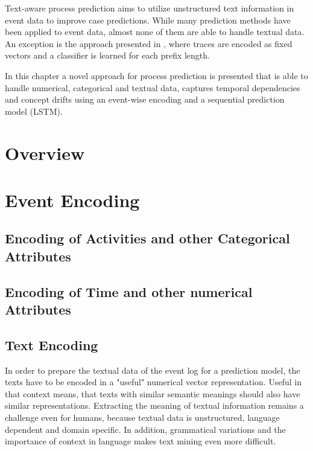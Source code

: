 Text-aware process prediction aims to utilize unstructured text information in event data to improve case predictions.
While many prediction methods have been applied to event data, almost none of them are able to handle textual data.
An exception is the approach presented in \cite{DBLP:conf/bpm/TeinemaaDMF16}, where traces are encoded as fixed vectors and a classifier is learned for each prefix length.

In this chapter a novel approach for process prediction is presented that is able to handle numerical, categorical and textual data, captures temporal dependencies and concept drifts using an event-wise encoding and a sequential prediction model (LSTM).

\section{Overview}





\section{Event Encoding}

\subsection{Encoding of Activities and other Categorical Attributes}

\subsection{Encoding of Time and other numerical Attributes}

\subsection{Text Encoding}

In order to prepare the textual data of the event log for a prediction model, the texts have to be encoded in a "useful" numerical vector representation.
Useful in that context means, that texts with similar semantic meanings should also have similar representations.
Extracting the meaning of textual information remains a challenge even for humans, because textual data is unstructured, language dependent and domain specific.
In addition, grammatical variations and the importance of context in language makes text mining even more difficult.

